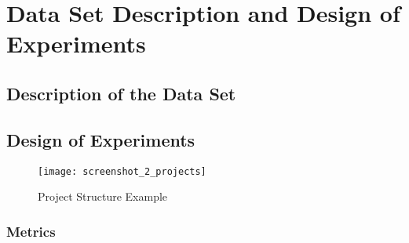 \chapter{Data Set Description and Design of Experiments\label{cha:chapter4}}

\section{Description of the Data Set\label{sec:xx}}

\section{Design of Experiments\label{sec:yy}}

\begin{figure}[htb]
  \centering
  \texttt{[image: screenshot\_2\_projects]}
  \caption{Project Structure Example}
  \label{fig:projects}
\end{figure}

\subsection{Metrics}

